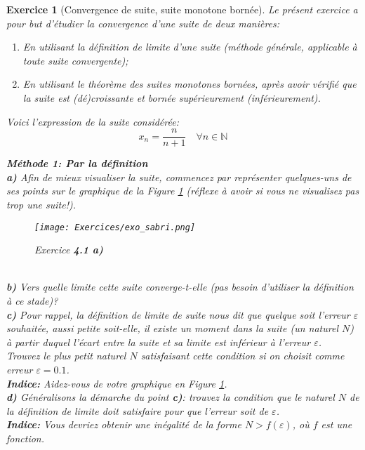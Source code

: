 \documentclass{article}
\newcommand{\Nn}{{\mathbb{N}}}
\theoremstyle{exercice}
\newtheorem{exercice}{Exercice}
\begin{document}
\begin{exercice} [Convergence de suite, suite monotone bornée]
    
Le présent exercice a pour but d'étudier la convergence d'une suite de deux manières:
\begin{enumerate}
    \item En utilisant la définition de limite d'une suite (méthode générale, applicable à toute suite convergente);
    \item En utilisant le théorème des suites monotones bornées, après avoir vérifié que la suite est (dé)croissante et bornée supérieurement (inférieurement).
\end{enumerate}

Voici l'expression de la suite considérée:
\begin{equation}
    x_n = \frac{n}{n+1} \quad \forall n\in \Nn
    \label{exo_suite_limite}
\end{equation}

\textbf{Méthode 1: Par la définition}\\

\textbf{a)} Afin de mieux visualiser la suite, commencez par représenter quelques-uns de ses points sur le graphique de la Figure \ref{fig:exo4.1a} (réflexe à avoir si vous ne visualisez pas trop une suite!). \\

\begin{figure}[H]
    \centering
    \texttt{[image: Exercices/exo\_sabri.png]}
    \caption{Exercice \textbf{4.1 a)}}
    \label{fig:exo4.1a}
\end{figure}\\

\textbf{b)} Vers quelle limite cette suite converge-t-elle (pas besoin d'utiliser la définition à ce stade)? \\

\textbf{c)} Pour rappel, la définition de limite de suite nous dit que quelque soit l'erreur $\varepsilon$ souhaitée, aussi petite soit-elle, il existe un moment dans la suite (un naturel $N$) à partir duquel l'écart entre la suite et sa limite est inférieur à l'erreur $\varepsilon$.\\ 
Trouvez le plus petit naturel $N$ satisfaisant cette condition si on choisit comme erreur $\varepsilon = 0.1$. \\ \textbf{Indice:} Aidez-vous de votre graphique en Figure \ref{fig:exo4.1a}.\\

\textbf{d)} Généralisons la démarche du point \textbf{c)}: trouvez la condition que le naturel $N$ de la définition de limite doit satisfaire pour que l'erreur soit de $\varepsilon$.\\
\textbf{Indice:} Vous devriez obtenir une inégalité de la forme $N > f(\varepsilon)$, où $f$ est une fonction.\\


\end{exercice}
\end{document}

